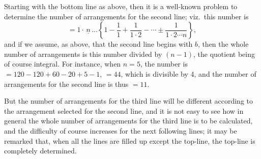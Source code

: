 \documentclass[11pt,a4paper]{article}
\begin{document}
Starting with the bottom line as above, then it is a well-known problem to determine the number of arrangements for the second line; viz.\ this number is
\[
= 1 \cdot \underline{\,n\,} \ldots \left\{1 - \frac{1}{1} + \frac{1}{1 \cdot 2} - \cdots \pm \frac{1}{1 \cdot 2 \cdots n}\right\},
\]
and if we assume, as above, that the second line begins with $b$, then the whole number of arrangements is this number divided by $(n - 1)$, the quotient being of course integral. For instance, when $n = 5$, the number is $= 120 - 120 + 60 - 20 + 5 - 1$, $= 44$, which is divisible by 4, and the number of arrangements for the second line is thus $= 11$.

But the number of arrangements for the third line will be different according to the arrangement selected for the second line, and it is not easy to see how in general the whole number of arrangements for the third line is to be calculated, and the difficulty of course increases for the next following lines; it may be remarked that, when all the lines are filled up except the top-line, the top-line is completely determined.
\end{document}

